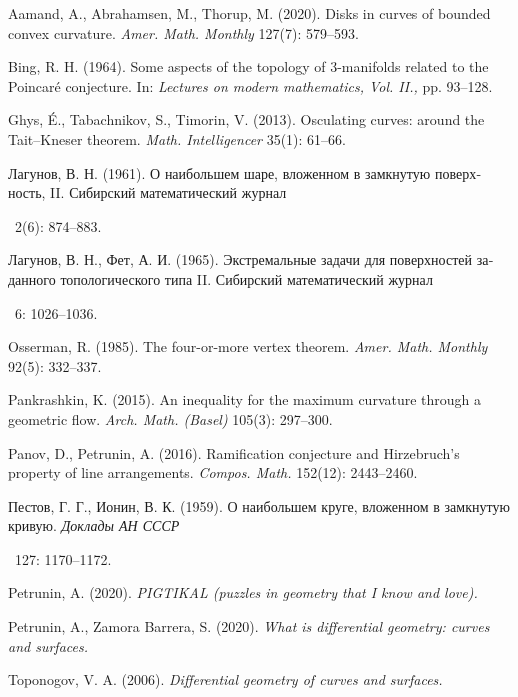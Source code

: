 \documentclass{article}
\theoremstyle{theorem}
\theoremstyle{definition}
\begin{document}
\begin{thebibliography}{1}
Aamand, A.,
Abrahamsen, M.,
Thorup, M.
(2020).
Disks in curves of bounded convex curvature.
\textit{Amer. Math. Monthly}
127(7): 579--593.

 Bing, R. H.
(1964).
Some aspects of the topology of 3-manifolds related to the Poincaré conjecture. 
In:
\textit{Lectures on modern mathematics, Vol. II.,} 
pp. 93--128.

Ghys, É.,
Tabachnikov, S.,
Timorin, V. 
(2013).
Osculating curves: around the Tait--Kneser theorem.
\textit{Math. Intelligencer}
35(1): 61--66.


\begin{otherlanguage}{russian}{
Лагунов, В. Н.
(1961).
О наибольшем шаре, вложенном в замкнутую поверхность, II.
Сибирский математический журнал}\end{otherlanguage}
\ 2(6): 874--883.


\begin{otherlanguage}{russian}{
Лагунов, В. Н., Фет, А. И. 
(1965).
Экстремальные задачи для поверхностей заданного топологического типа II.
Сибирский математический журнал}\end{otherlanguage}
\ 6: 1026--1036.

Osserman, R. 
(1985).
The four-or-more vertex theorem.
\textit{Amer. Math. Monthly}
92(5): 332--337.


Pankrashkin, K. 
(2015).
An inequality for the maximum curvature through a geometric flow. 
\textit{Arch. Math. (Basel)} 105(3): 297--300.

Panov, D., Petrunin, A.
(2016).
Ramification conjecture and Hirzebruch’s property of line arrangements.
\textit{Compos. Math.} 152(12): 2443--2460.

\begin{otherlanguage}{russian}{
Пестов, Г. Г., Ионин, В. К.
(1959).
О наибольшем круге, вложенном в замкнутую кривую.
\textit{Доклады АН СССР}}\end{otherlanguage}\ 
127: 1170--1172.

Petrunin, A.
(2020).
\textit{PIGTIKAL (puzzles in geometry that I know and love).}

Petrunin, A., Zamora Barrera, S.
(2020).
\textit{What is differential geometry: curves and surfaces.}

Toponogov, V. A.
(2006).
\textit{Differential geometry of curves and surfaces.}

\end{thebibliography}
\end{document}
